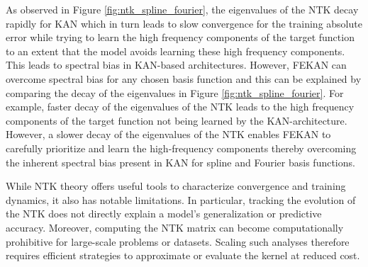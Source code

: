 \documentclass{article}
\begin{document}
\begin{itemize}
    As observed in Figure \ref{fig:ntk_spline_fourier}, the eigenvalues of the NTK decay rapidly for KAN which in turn leads to slow convergence for the training absolute error while trying to learn the high frequency components of the target function to an extent that the model avoids learning these high frequency components. This leads to spectral bias in KAN-based architectures.
    However, FEKAN can overcome spectral bias for any chosen basis function and this can be explained by comparing the decay of the eigenvalues in Figure \ref{fig:ntk_spline_fourier}. For example, faster decay of the eigenvalues of the NTK leads to the high frequency components of the target function not being learned by the KAN-architecture. However, a slower decay of the eigenvalues of the NTK enables FEKAN to carefully prioritize and learn the high-frequency components thereby overcoming the inherent spectral bias present in KAN for spline and Fourier basis functions. %
\end{itemize}

While NTK theory offers useful tools to characterize convergence and training dynamics, it also has notable limitations. In particular, tracking the evolution of the NTK does not directly explain a model’s generalization or predictive accuracy. Moreover, computing the NTK matrix can become computationally prohibitive for large-scale problems or datasets. Scaling such analyses therefore requires efficient strategies to approximate or evaluate the kernel at reduced cost. %
\end{document}
